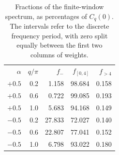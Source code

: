 \begin{table}[!htbp]
 \caption{Fractions of the finite-window spectrum, as percentages of $C_q(0)$.
 The intervals refer to the discrete frequency period, with zero split equally
 between the first two columns of weights.}
 \label{tab:window-weight}
 \begin{ruledtabular}
 \begin{tabular}{rrrrr}
 $\alpha$ & $q/\pi$ & $f_-$ & $f_{[0,4]}$ & $f_{>4}$\\
 $+0.5$ & 0.2 & 1.158 & 98.684 & 0.158\\
 $+0.5$ & 0.6 & 0.722 & 99.085 & 0.193\\
 $+0.5$ & 1.0 & 5.683 & 94.168 & 0.149\\
 $-0.5$ & 0.2 & 27.833 & 72.027 & 0.140\\
 $-0.5$ & 0.6 & 22.807 & 77.041 & 0.152\\
 $-0.5$ & 1.0 & 6.798 & 93.022 & 0.180\\
 \end{tabular}
 \end{ruledtabular}
\end{table}
